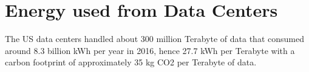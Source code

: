 \documentclass[
  a4paper,  %
  twoside,  %
  bibliography=totoc,
  headsepline,
  cleardoublepage=empty,
  parskip=half,
  draft=false
]{scrbook}
\begin{document}








\chapter{Energy used from Data Centers}\label{chap4}

The US data centers handled about 300 million Terabyte of data that consumed around 8.3 billion kWh per year in 2016, hence 27.7 kWh per Terabyte with a carbon footprint of approximately 35 kg CO2 per Terabyte of data\cite{corbett2018sustainable}.
\end{document}
